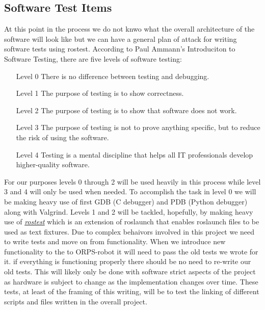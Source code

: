 \documentclass[english,12pt]{article}
\begin{document}
\subsection{Software Test Items}
At this point in the process we do not knwo what the overall architecture of the software will 
look like but we can have a general plan of attack for writing software tests using rostest. According 
to Paul Ammann's Introduciton to Software Testing, there are five levels of software testing: \\
\begin{itemize}
    \item[Level 0] There is no difference between testing and debugging.
    \item[Level 1] The purpose of testing is to show correctness.
    \item[Level 2] The purpose of testing is to show that software does not work.
    \item[Level 3] The purpose of testing is not to prove anything specific, 
    but to reduce the risk of using the software.
    \item[Level 4] Testing is a mental discipline that helps all IT professionals 
    develop higher-quality software.
\end{itemize}
For our purposes levels 0 through 2 will be used heavily in this process while level 3 and 4 will 
only be used when needed. To accomplish the task in level 0 we will be making heavy use of first 
GDB (C debugger) and PDB (Python debugger) along with Valgrind. Levels 1 and 2 will be tackled, 
hopefully, by making heavy use of \href{http://wiki.ros.org/rostest}{\textit{rostest}} which is an 
extension of roslaunch that enables roslaunch files to be used as text fixtures. Due to complex 
behaivors involved in this project we need to write tests and move on from functionality. When we 
introduce new functionality to the to ORPS-robot it will need to pass the old tests we wrote for it. 
if everything is functioning properly there should be no need to re-write our old tests. This will 
likely only be done with software strict aspects of the project as hardware is subject to change as 
the implementation changes over time. These tests, at least of the framing of this writing, will be 
to test the linking of different scripts and files written in the overall project. 
\end{document}
